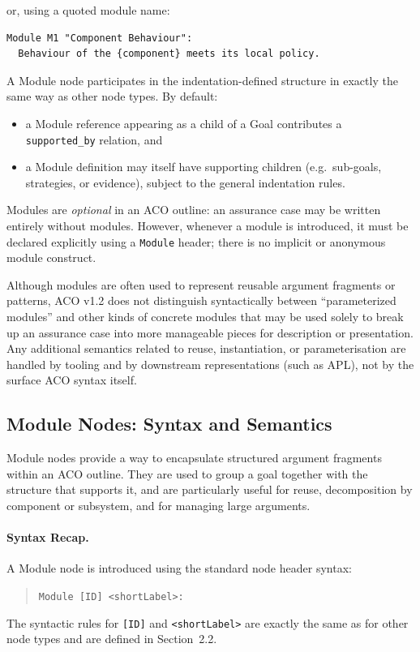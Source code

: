 \documentclass[11pt]{article}
\begin{document}
or, using a quoted module name:
\begin{verbatim}
Module M1 "Component Behaviour":
  Behaviour of the {component} meets its local policy.
\end{verbatim}

A Module node participates in the indentation-defined structure in exactly the same way as
other node types. By default:
\begin{itemize}[leftmargin=2em]
  \item a Module reference appearing as a child of a Goal contributes a
        \texttt{supported\_by} relation, and
  \item a Module definition may itself have supporting children (e.g.\ sub-goals, strategies, or evidence),
        subject to the general indentation rules.
\end{itemize}

Modules are \emph{optional} in an ACO outline: an assurance case may be written entirely
without modules. However, whenever a module is introduced, it must be declared explicitly
using a \texttt{Module} header; there is no implicit or anonymous module construct.

Although modules are often used to represent reusable argument fragments or patterns,
ACO v1.2 does not distinguish syntactically between ``parameterized modules'' and other kinds
of concrete modules that may be used solely to break up an assurance case into more manageable pieces for description or presentation. Any additional semantics related to reuse, instantiation, or parameterisation
are handled by tooling and by downstream representations (such as APL), not by the
surface ACO syntax itself.

\subsection{Module Nodes: Syntax and Semantics}
\label{sec:module-semantics}

Module nodes provide a way to encapsulate structured argument fragments within an
ACO outline. They are used to group a goal together with the structure that supports
it, and are particularly useful for reuse, decomposition by component or subsystem,
and for managing large arguments.

\paragraph{Syntax Recap.}
A Module node is introduced using the standard node header syntax:
\begin{quote}
\texttt{Module [ID] \textless shortLabel\textgreater:}
\end{quote}
The syntactic rules for \texttt{[ID]} and \texttt{\textless shortLabel\textgreater{}}
are exactly the same as for other node types and are defined in Section~2.2.
\end{document}

